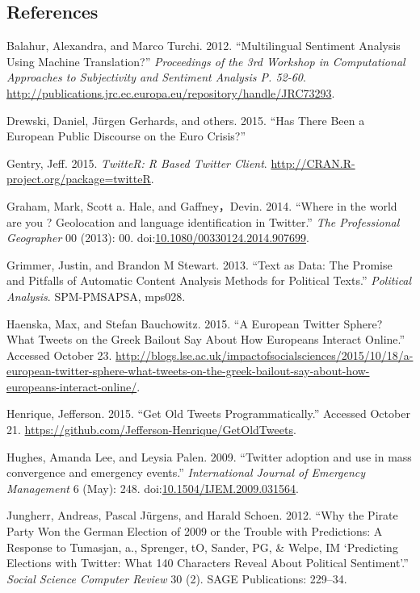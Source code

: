 \documentclass[]{article}
\begin{document}
\subsection*{References}\label{references}

Balahur, Alexandra, and Marco Turchi. 2012. ``Multilingual Sentiment
Analysis Using Machine Translation?'' \emph{Proceedings of the 3rd
Workshop in Computational Approaches to Subjectivity and Sentiment
Analysis P. 52-60}.
\url{http://publications.jrc.ec.europa.eu/repository/handle/JRC73293}.

Drewski, Daniel, J{ü}rgen Gerhards, and others. 2015. ``Has There Been a
European Public Discourse on the Euro Crisis?''

Gentry, Jeff. 2015. \emph{TwitteR: R Based Twitter Client}.
\url{http://CRAN.R-project.org/package=twitteR}.

Graham, Mark, Scott a. Hale, and Gaffney，Devin. 2014. ``Where in the
world are you ? Geolocation and language identification in Twitter.''
\emph{The Professional Geographer} 00 (2013): 00.
doi:\href{http://dx.doi.org/10.1080/00330124.2014.907699}{10.1080/00330124.2014.907699}.

Grimmer, Justin, and Brandon M Stewart. 2013. ``Text as Data: The
Promise and Pitfalls of Automatic Content Analysis Methods for Political
Texts.'' \emph{Political Analysis}. SPM-PMSAPSA, mps028.

Haenska, Max, and Stefan Bauchowitz. 2015. ``A European Twitter Sphere?
What Tweets on the Greek Bailout Say About How Europeans Interact
Online.'' Accessed October 23.
\url{http://blogs.lse.ac.uk/impactofsocialsciences/2015/10/18/a-european-twitter-sphere-what-tweets-on-the-greek-bailout-say-about-how-europeans-interact-online/}.

Henrique, Jefferson. 2015. ``Get Old Tweets Programmatically.'' Accessed
October 21. \url{https://github.com/Jefferson-Henrique/GetOldTweets}.

Hughes, Amanda Lee, and Leysia Palen. 2009. ``Twitter adoption and use
in mass convergence and emergency events.'' \emph{International Journal
of Emergency Management} 6 (May): 248.
doi:\href{http://dx.doi.org/10.1504/IJEM.2009.031564}{10.1504/IJEM.2009.031564}.

Jungherr, Andreas, Pascal J{ü}rgens, and Harald Schoen. 2012. ``Why the
Pirate Party Won the German Election of 2009 or the Trouble with
Predictions: A Response to Tumasjan, a., Sprenger, tO, Sander, PG, \&
Welpe, IM `Predicting Elections with Twitter: What 140 Characters Reveal
About Political Sentiment'.'' \emph{Social Science Computer Review} 30
(2). SAGE Publications: 229--34.
\end{document}
